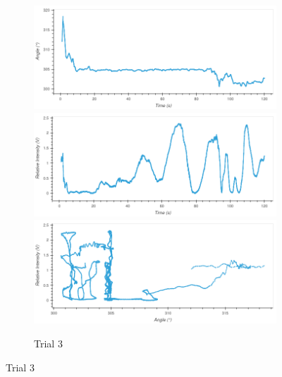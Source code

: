 \begin{figure}
\begin{subfigure}{1.0\textwidth}
\caption{Trial 3}
\includegraphics[width=\plotwidth]{plots/t3-time-angle.png}
\includegraphics[width=\plotwidth]{plots/t3-time-intensity.png}
\includegraphics[width=\plotwidth]{plots/t3-angle-intensity.png}
\end{subfigure}




\end{figure}
